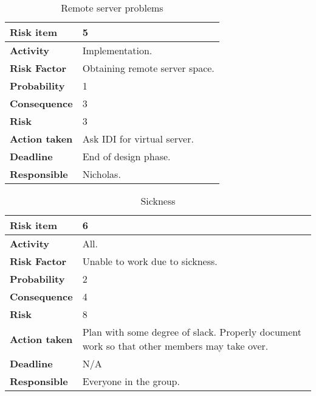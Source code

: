\begin{table}[htdp]
\caption{Remote server problems}
\begin{center}
\begin{tabularx}{\textwidth}{| X | X |}
\hline
\textbf{Risk item} & 5 \\
\hline
\textbf{Activity} & Implementation.  \\
\hline
\textbf{Risk Factor} & Obtaining remote server space. \\
\hline
\textbf{Probability} & 1 \\
\hline
\textbf{Consequence} & 3 \\
\hline
\textbf{Risk} & 3 \\
\hline
\textbf{Action taken} & Ask IDI for virtual server. \\
\hline
\textbf{Deadline} & End of design phase. \\
\hline
\textbf{Responsible} & Nicholas. \\
\hline
\end{tabularx}
\end{center}
\label{risk_5}
\end{table}


\begin{table}[htdp]
\caption{Sickness}
\begin{center}
\begin{tabularx}{\textwidth}{| X | X |}
\hline
\textbf{Risk item} & 6 \\
\hline
\textbf{Activity} & All. \\
\hline
\textbf{Risk Factor} & Unable to work due to sickness. \\
\hline
\textbf{Probability} & 2 \\
\hline
\textbf{Consequence} & 4 \\
\hline
\textbf{Risk} & 8 \\
\hline
\textbf{Action taken} & Plan with some degree of slack. \newline Properly document work so that other members may take over. \\
\hline
\textbf{Deadline} & N/A \\
\hline
\textbf{Responsible} & Everyone in the group.\\
\hline
\end{tabularx}
\end{center}
\label{risk_6}
\end{table}

